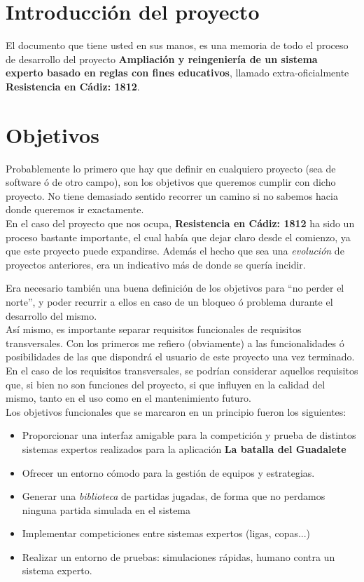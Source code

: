\section{Introducción del proyecto}

El documento que tiene usted en sus manos, es una memoria de todo el proceso de desarrollo
del proyecto \textbf{Ampliación y reingeniería de un sistema experto basado en reglas con
fines educativos}, llamado extra-oficialmente \textbf{Resistencia en Cádiz: 1812}.\\

\section{Objetivos}

Probablemente lo primero que hay que definir en cualquiero proyecto (sea de 
software ó de otro campo), son los objetivos que queremos cumplir con dicho proyecto.
No tiene demasiado sentido recorrer un camino si no sabemos hacia donde queremos ir 
exactamente.\\

En el caso del proyecto que nos ocupa, \textbf{Resistencia en Cádiz: 1812} ha sido
un proceso bastante importante, el cual había que dejar claro desde el comienzo, ya
que este proyecto puede expandirse. Además el hecho que sea una \textit{evolución}
de proyectos anteriores, era un indicativo más de donde se quería incidir.

Era necesario también una buena definición de los objetivos para ``no perder el norte'',
y poder recurrir a ellos en caso de un bloqueo ó problema durante el desarrollo del
mismo.\\

Así mismo, es importante separar requisitos funcionales de requisitos transversales.
Con los primeros me refiero (obviamente) a las funcionalidades ó posibilidades de las
que dispondrá el usuario de este proyecto una vez terminado. En el caso de los
requisitos transversales, se podrían considerar aquellos requisitos que, si bien no
son funciones del proyecto, si que influyen en la calidad del mismo, tanto en el
uso como en el mantenimiento futuro.\\

\noindent Los objetivos funcionales que se marcaron en un principio fueron los siguientes:

\begin{itemize}
\item Proporcionar una interfaz amigable para la competición y prueba
  de distintos sistemas expertos realizados para la aplicación \textbf{La batalla
  del Guadalete}
\item Ofrecer un entorno cómodo para la gestión de equipos y estrategias.
\item Generar una \textit{biblioteca} de partidas jugadas, de forma que no perdamos
  ninguna partida simulada en el sistema
\item Implementar competiciones entre sistemas expertos (ligas, copas...)
\item Realizar un entorno de pruebas: simulaciones rápidas, humano contra un sistema
  experto.
\end{itemize}

